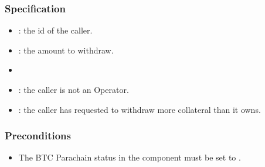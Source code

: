 \documentclass[a4paper,10pt,english]{sphinxmanual}
\begin{document}
\subsubsection{Specification}
\label{\detokenize{spec/nomination:id18}}


\begin{itemize}
\item {} 
: the id of the caller.

\item {} 
: the amount to withdraw.

\end{itemize}

\begin{itemize}
\item {} 

\end{itemize}

\begin{itemize}
\item {} 
: the caller is not an Operator.

\item {} 
: the caller has requested to withdraw more collateral than it owns.

\end{itemize}


\subsubsection{Preconditions}
\label{\detokenize{spec/nomination:id19}}\begin{itemize}
\item {} 
The BTC Parachain status in the {\hyperref[\detokenize{spec/security:security}]{}} component must be set to .

\end{itemize}
\end{document}
